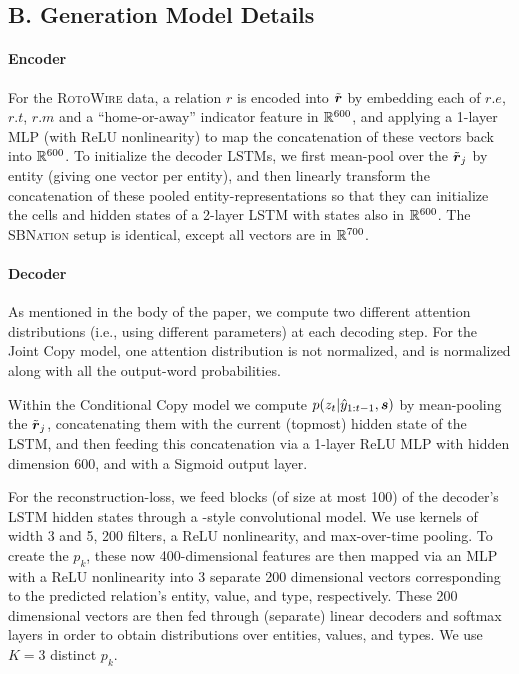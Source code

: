 \documentclass[11pt,letterpaper]{article}
\begin{document}
\subsection*{B. Generation Model Details}
\label{sec:suppgen}
\paragraph{Encoder} For the \textsc{RotoWire} data, a relation $r$ is encoded into $\tilde{\boldsymbol{r}}$ by embedding each of $r.e$, $r.t$, $r.m$ and a ``home-or-away'' indicator feature in $\mathbb{R}^{600}$, and applying a 1-layer MLP (with ReLU nonlinearity) to map the concatenation of these vectors back into $\mathbb{R}^{600}$. To initialize the decoder LSTMs, we first mean-pool over the $\tilde{\boldsymbol{r}}_j$ by entity (giving one vector per entity), and then linearly transform the concatenation of these pooled entity-representations so that they can initialize the cells and hidden states of a 2-layer LSTM with states also in $\mathbb{R}^{600}$. The \textsc{SBNation} setup is identical, except all vectors are in $\mathbb{R}^{700}$.

\paragraph{Decoder} As mentioned in the body of the paper, we compute two different attention distributions (i.e., using different parameters) at each decoding step. For the Joint Copy model, one attention distribution is not normalized, and is normalized along with all the output-word probabilities. 

Within the Conditional Copy model we compute $p(z_t | \hat{y}_{1:t-1}, \boldsymbol{s})$ by mean-pooling the $\tilde{\boldsymbol{r}}_j$, concatenating them with the current (topmost) hidden state of the LSTM, and then feeding this concatenation via a 1-layer ReLU MLP with hidden dimension 600, and with a Sigmoid output layer. 

For the reconstruction-loss, we feed blocks (of size at most 100) of the decoder's LSTM hidden states through a \cite{kim2014convolutional}-style convolutional model. We use kernels of width 3 and 5, 200 filters, a ReLU nonlinearity, and max-over-time pooling. To create the $p_k$, these now 400-dimensional features are then mapped via an MLP with a ReLU nonlinearity into 3 separate 200 dimensional vectors corresponding to the predicted relation's entity, value, and type, respectively. These 200 dimensional vectors are then fed through (separate) linear decoders and softmax layers in order to obtain distributions over entities, values, and types. We use $K=3$ distinct $p_k$.
\end{document}
